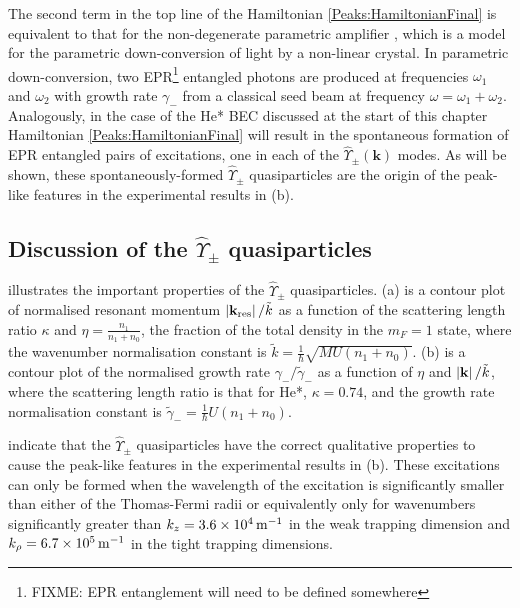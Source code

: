 The second term in the top line of the Hamiltonian \eqref{Peaks:HamiltonianFinal} is equivalent to that for the non-degenerate parametric amplifier \citep{WallsMilburn}, which is a model for the parametric down-conversion of light by a non-linear crystal. In parametric down-conversion, two EPR\footnote{FIXME: EPR entanglement will need to be defined somewhere} entangled photons are produced at frequencies $\omega_1$ and $\omega_2$ with growth rate $\gamma_-$ from a classical seed beam at frequency $\omega = \omega_1 + \omega_2$. Analogously, in the case of the He* BEC discussed at the start of this chapter Hamiltonian \eqref{Peaks:HamiltonianFinal} will result in the spontaneous formation of EPR entangled pairs of excitations, one in each of the $\hat{\Upsilon}_\pm(\mathbf{k})$ modes. As will be shown, these spontaneously-formed $\hat{\Upsilon}_\pm$ quasiparticles are the origin of the peak-like features in the experimental results in (b). %

\subsection{Discussion of the $\hat{\Upsilon}_\pm$ quasiparticles}

 illustrates the important properties of the $\hat{\Upsilon}_\pm$ quasiparticles. (a) is a contour plot of normalised resonant momentum $\left|\mathbf{k}_\text{res}\right|/\tilde{k}$ as a function of the scattering length ratio $\kappa$ and $\displaystyle\eta = \frac{n_1}{n_1 + n_0}$, the fraction of the total density in the $m_F=1$ state, where the wavenumber normalisation constant is $\tilde{k} = \frac{1}{\hbar}\sqrt{MU(n_1 + n_0)}$.  (b) is a contour plot of the normalised growth rate $\gamma_-/\tilde{\gamma}_-$ as a function of $\eta$ and $\left|\mathbf{k}\right|/\tilde{k}$, where the scattering length ratio is that for He*, $\kappa = 0.74$, and the growth rate normalisation constant is $\tilde{\gamma}_- = \frac{1}{\hbar}U(n_1+n_0)$.

 indicate that the $\hat{\Upsilon}_\pm$ quasiparticles have the correct qualitative properties to cause the peak-like features in the experimental results in (b). These excitations can only be formed when the wavelength of the excitation is significantly smaller than either of the Thomas-Fermi radii or equivalently only for wavenumbers significantly greater than $k_z=\unit[3.6\times 10^4]{m}^{-1}$ in the weak trapping dimension and $k_\rho=\unit[6.7\times 10^5]{m}^{-1}$ in the tight trapping dimensions. 


